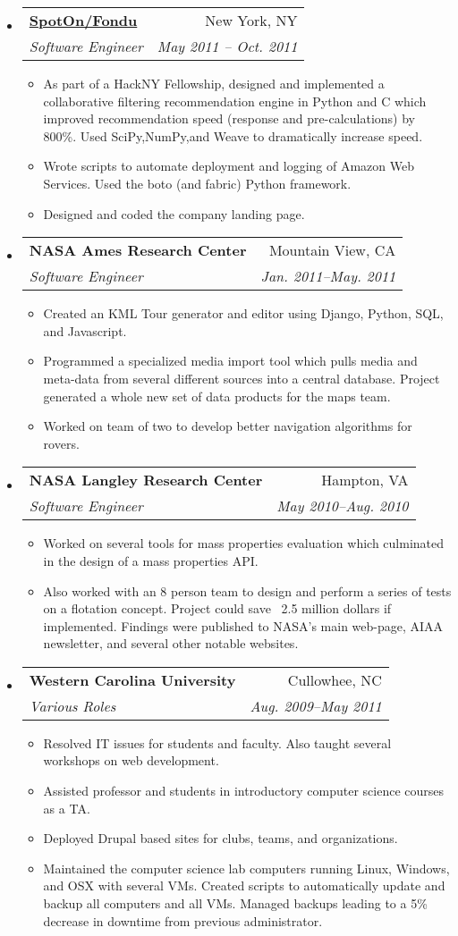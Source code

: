\documentclass[letterpaper,11pt]{article}
\makeatletter
\newcommand{\resitem}[1]{\item #1 \vspace{-2pt}}
\newcommand{\ressubheading}[4]{
\begin{tabular*}{7.0in}{l@{\extracolsep{\fill}}r}
		\textbf{#1} & #2 \\
		\textit{#3} & \textit{#4} \\
\end{tabular*}\vspace{-6pt}}
\makeatother
\begin{document}
\begin{itemize}
\item
	\ressubheading{\href{http://fondu.com/}{SpotOn/Fondu}}{New York, NY}{Software Engineer}{May 2011 -- Oct. 2011}
	\begin{itemize}
		\resitem{As part of a HackNY Fellowship, designed and implemented a collaborative filtering recommendation engine in Python and C which improved recommendation speed (response and pre-calculations) by 800\%. Used SciPy,NumPy,and Weave to dramatically increase speed.}
		\resitem{Wrote scripts to automate deployment and logging of Amazon Web Services. Used the boto (and fabric) Python framework.}
		\resitem{Designed and coded the company landing page.}
	\end{itemize}
\item
   \ressubheading{NASA Ames Research Center}{Mountain View, CA}{Software Engineer}{Jan. 2011--May. 2011}
   \begin{itemize}
      \resitem{Created an KML Tour generator and editor using Django, Python, SQL, and Javascript.}
      \resitem{Programmed a specialized media import tool which pulls media and meta-data from several different sources into a central database. Project generated a whole new set of data products for the maps team.}
      \resitem{Worked on team of two to develop better navigation algorithms for rovers.}
   \end{itemize}
\item
   \ressubheading{NASA Langley Research Center}{Hampton, VA}{Software Engineer}{May 2010--Aug. 2010}
      \begin{itemize}
         \resitem{Worked on several tools for mass properties evaluation
         which culminated in the design of a mass properties API.} 
         \resitem{Also worked
         with an 8 person team to design and perform a series of tests on
         a flotation concept. Project could save ~2.5 million dollars if implemented.
         Findings were published to NASA's main web-page, AIAA
         newsletter, and several other notable websites.}
      \end{itemize}
\item
   \ressubheading{Western Carolina University}{Cullowhee, NC}{Various Roles}{Aug. 2009--May 2011}
      \begin{itemize}
         \resitem{Resolved IT issues for students and faculty. Also taught several workshops on web development.}
         \resitem{Assisted professor and students in introductory computer science courses as a TA.}
         \resitem{Deployed Drupal based sites for clubs, teams, and organizations.}
         \resitem{Maintained the computer science lab computers running Linux, Windows, and OSX with several VMs. Created scripts to automatically update and backup all computers and all VMs. Managed backups leading to a 5\% decrease in downtime from previous administrator.}
      \end{itemize}
\end{itemize}
\end{document}
